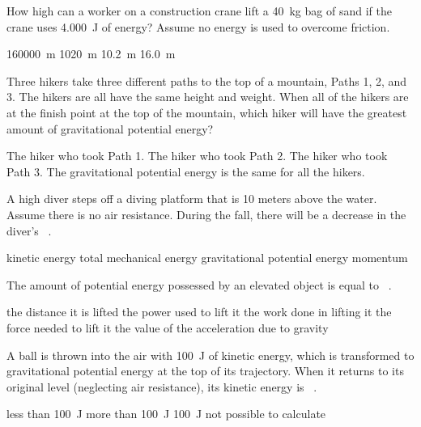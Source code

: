 \documentclass[]{exam}
\begin{document}
\begin{questions}
\question
How high can a worker on a construction crane lift a \SI{40}{kg} bag of sand if the crane uses \SI{4,000}{J} of energy? Assume no energy is used to overcome friction.

\begin{randomizechoices}
\choice \SI{160000}{m}
\choice \SI{1020}{m}
\correctchoice \SI{10.2}{m}
\choice \SI{16.0}{m}
\end{randomizechoices}

\question
Three hikers take three different paths to the top of a mountain, Paths 1, 2, and 3. The hikers are all have the same height and weight. When all of the hikers are at the finish point at the top of the mountain, which hiker will have the greatest amount of gravitational potential energy?

\begin{randomizechoices}
\choice The hiker who took Path 1. 
\choice The hiker who took Path 2.
\choice The hiker who took Path 3.
\choice The gravitational potential energy is the same for all the hikers.
\end{randomizechoices}

\question
A high diver steps off a diving platform that is 10 meters above the water. Assume there is no air resistance. During the fall, there will be a decrease in the diver's \fillin\ .

\begin{randomizechoices}
\choice kinetic energy
\choice total mechanical energy
\correctchoice gravitational potential energy
\choice momentum
\end{randomizechoices}


\question
The amount of potential energy possessed by an elevated object is equal to \fillin\ .

\begin{randomizechoices}
\choice the distance it is lifted
\choice the power used to lift it
\correctchoice the work done in lifting it
\choice the force needed to lift it
\choice the value of the acceleration due to gravity
\end{randomizechoices}

\question
A  ball is thrown into the air with \SI{100}{J} of kinetic energy, which is transformed to gravitational potential energy at the top of its trajectory. When it returns to its original level (neglecting air resistance), its kinetic energy is \fillin\ .

\begin{randomizechoices}
\choice less than \SI{100}{J}
\choice more than \SI{100}{J}
\correctchoice \SI{100}{J}
\choice not possible to calculate
\end{randomizechoices}


\end{questions}
\end{document}
